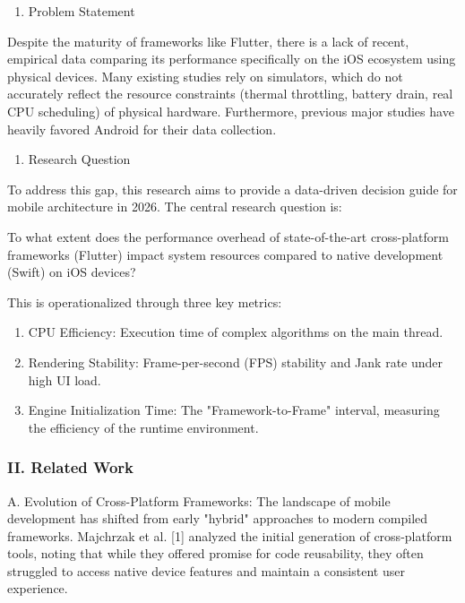 \documentclass[
]{article}
\begin{document}
\begin{enumerate}
\def\labelenumi{\Alph{enumi}.}
\setcounter{enumi}{1}
\item
  Problem Statement
\end{enumerate}

Despite the maturity of frameworks like Flutter, there is a lack of
recent, empirical data comparing its performance specifically on the iOS
ecosystem using physical devices. Many existing studies rely on
simulators, which do not accurately reflect the resource constraints
(thermal throttling, battery drain, real CPU scheduling) of physical
hardware. Furthermore, previous major studies have heavily favored
Android for their data collection.

\begin{enumerate}
\def\labelenumi{\Alph{enumi}.}
\setcounter{enumi}{2}
\item
  Research Question
\end{enumerate}

To address this gap, this research aims to provide a data-driven
decision guide for mobile architecture in 2026. The central research
question is:

To what extent does the performance overhead of state-of-the-art
cross-platform frameworks (Flutter) impact system resources compared to
native development (Swift) on iOS devices?

This is operationalized through three key metrics:

\begin{enumerate}
\def\labelenumi{\arabic{enumi}.}
\item
  CPU Efficiency: Execution time of complex algorithms on the main
  thread.
\item
  Rendering Stability: Frame-per-second (FPS) stability and Jank rate
  under high UI load.
\item
  Engine Initialization Time: The "Framework-to-Frame" interval,
  measuring the efficiency of the runtime environment.
\end{enumerate}

\subsubsection{\texorpdfstring{\textbf{II. Related
Work}}{II. Related Work}}\label{ii.-related-work}

A. Evolution of Cross-Platform Frameworks: The landscape of mobile
development has shifted from early "hybrid" approaches to modern
compiled frameworks. Majchrzak et al. {[}1{]} analyzed the initial
generation of cross-platform tools, noting that while they offered
promise for code reusability, they often struggled to access native
device features and maintain a consistent user experience.
\end{document}

